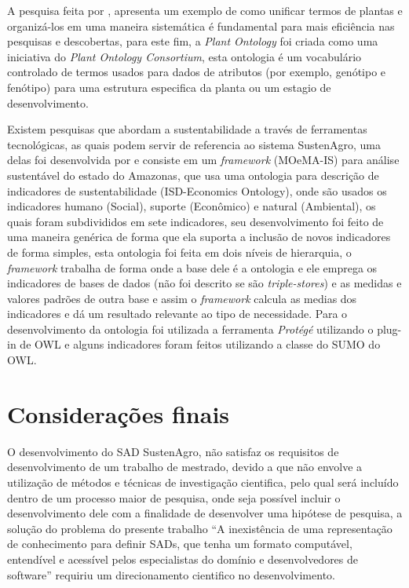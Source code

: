 A pesquisa feita por \citet{boseley2009development}, apresenta um
exemplo de como unificar termos de plantas e organizá-los em uma maneira
sistemática é fundamental para mais eficiência nas pesquisas e descobertas,
para este fim, a \foreignlanguage{english}{\emph{Plant Ontology}}
foi criada como uma iniciativa do \foreignlanguage{english}{\emph{Plant
Ontology Consortium}}, esta ontologia é um vocabulário controlado
de termos usados para dados de atributos (por exemplo, genótipo e
fenótipo) para uma estrutura especifica da planta ou um estagio de
desenvolvimento.

Existem pesquisas que abordam a sustentabilidade a través de ferramentas
tecnológicas, as quais podem servir de referencia ao sistema SustenAgro,
uma delas foi desenvolvida por \citet{brilhante:2006} e consiste
em um \emph{framework} (MOeMA-IS) para análise sustentável do estado
do Amazonas, que usa uma ontologia para descrição de indicadores de
sustentabilidade (\foreignlanguage{english}{ISD-Economics Ontology}),
onde são usados os indicadores humano (Social), suporte (Econômico)
e natural (Ambiental), os quais foram subdivididos em sete indicadores,
seu desenvolvimento foi feito de uma maneira genérica de forma que
ela suporta a inclusão de novos indicadores de forma simples, esta
ontologia foi feita em dois níveis de hierarquia, o \emph{framework
}trabalha de forma onde a base dele é a ontologia e ele emprega os
indicadores de bases de dados (não foi descrito se são \foreignlanguage{english}{\emph{triple-stores}})
e as medidas e valores padrões de outra base e assim o \emph{framework}
calcula as medias dos indicadores e dá um resultado relevante ao tipo
de necessidade. Para o desenvolvimento da ontologia foi utilizada
a ferramenta \emph{Protégé} utilizando o \foreignlanguage{english}{plug-in}
de \foreignlanguage{english}{OWL} e alguns indicadores foram feitos
utilizando a classe do SUMO do \foreignlanguage{english}{OWL}.

\section{Considerações finais}

O desenvolvimento do SAD SustenAgro, não satisfaz os requisitos de
desenvolvimento de um trabalho de mestrado, devido a que não envolve
a utilização de métodos e técnicas de investigação cientifica, pelo
qual será incluído dentro de um processo maior de pesquisa, onde seja
possível incluir o desenvolvimento dele com a finalidade de desenvolver
uma hipótese de pesquisa, a solução do problema do presente trabalho
``A inexistência de uma representação de conhecimento para definir
SADs, que tenha um formato computável, entendível e acessível pelos
especialistas do domínio e desenvolvedores de software'' requiriu
um direcionamento cientifico no desenvolvimento.
